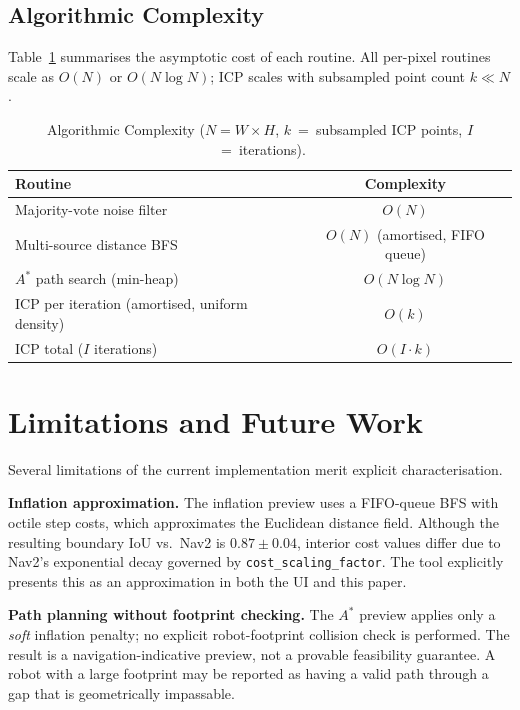 \documentclass[journal]{IEEEtran}
\begin{document}
\subsection{Algorithmic Complexity}

Table~\ref{tab:complexity} summarises the asymptotic cost of each routine.
All per-pixel routines scale as $O(N)$ or $O(N\log N)$; ICP scales with
subsampled point count $k\ll N$.

\begin{table}[t]
\centering
\caption{Algorithmic Complexity ($N=W\!\times\!H$, $k$~=~subsampled ICP points,
$I$~=~iterations).}
\label{tab:complexity}
\scriptsize
\renewcommand{\arraystretch}{1.0}
\begin{tabular}{@{}lc@{}}
\toprule
\textbf{Routine} & \textbf{Complexity} \\
\midrule
Majority-vote noise filter         & $O(N)$ \\
Multi-source distance BFS          & $O(N)$ (amortised, FIFO queue) \\
$A^{*}$ path search (min-heap)     & $O(N\log N)$ \\
ICP per iteration (amortised, uniform density) & $O(k)$ \\
ICP total ($I$ iterations)         & $O(I\cdot k)$ \\
\bottomrule
\end{tabular}
\vspace{-2mm}
\end{table}

\section{Limitations and Future Work}
\label{sec:limitations_future}

Several limitations of the current implementation merit explicit
characterisation.

\textbf{Inflation approximation.}  The inflation preview uses a FIFO-queue BFS
with octile step costs, which approximates the Euclidean distance field.
Although the resulting boundary IoU vs.\ Nav2 is $0.87\pm0.04$, interior cost
values differ due to Nav2's exponential decay governed by
\texttt{cost\_scaling\_factor}.  The tool explicitly presents this as an
approximation in both the UI and this paper.

\textbf{Path planning without footprint checking.}  The $A^{*}$ preview
applies only a \emph{soft} inflation penalty; no explicit robot-footprint
collision check is performed.  The result is a navigation-indicative preview,
not a provable feasibility guarantee.  A robot with a large footprint may be
reported as having a valid path through a gap that is geometrically
impassable.
\end{document}
